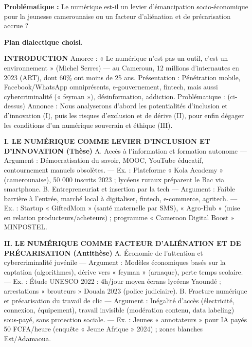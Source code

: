\documentclass[11pt]{article}
\begin{document}
\begin{exoresolu}
\textbf{Problématique :} Le numérique est-il un levier d'émancipation socio-économique pour la jeunesse camerounaise ou un facteur d'aliénation et de précarisation accrue ?

\textbf{Plan dialectique choisi.}

\textbf{INTRODUCTION}
Amorce : « Le numérique n'est pas un outil, c'est un environnement » (Michel Serres) — au Cameroun, 12 millions d'internautes en 2023 (ART), dont 60\% ont moins de 25 ans.
Présentation : Pénétration mobile, Facebook/WhatsApp omniprésents, e-gouvernement, fintech, mais aussi cybercriminalité (« feyman »), désinformation, addiction.
Problématique : (ci-dessus)
Annonce : Nous analyserons d'abord les potentialités d'inclusion et d'innovation (I), puis les risques d'exclusion et de dérive (II), pour enfin dégager les conditions d'un numérique souverain et éthique (III).

\textbf{I. LE NUMÉRIQUE COMME LEVIER D'INCLUSION ET D'INNOVATION (Thèse)}
A. Accès à l'information et formation autonome
— Argument : Démocratisation du savoir, MOOC, YouTube éducatif, contournement manuels obsolètes.
— Ex. : Plateforme « Kola Academy » (camerounaise), 50 000 inscrits 2023 ; lycéens ruraux préparent le Bac via smartphone.
B. Entrepreneuriat et insertion par la tech
— Argument : Faible barrière à l'entrée, marché local à digitaliser, fintech, e-commerce, agritech.
— Ex. : Startup « GiftedMom » (santé maternelle par SMS), « Agro-Hub » (mise en relation producteurs/acheteurs) ; programme « Cameroon Digital Boost » MINPOSTEL.

\textbf{II. LE NUMÉRIQUE COMME FACTEUR D'ALIÉNATION ET DE PRÉCARISATION (Antithèse)}
A. Économie de l'attention et cybercriminalité juvénile
— Argument : Modèles économiques basés sur la captation (algorithmes), dérive vers « feyman » (arnaque), perte temps scolaire.
— Ex. : Étude UNESCO 2022 : 4h/jour moyen écrans lycéens Yaoundé ; arrestations « brouteurs » Douala 2023 (police judiciaire).
B. Fracture numérique et précarisation du travail de clic
— Argument : Inégalité d'accès (électricité, connexion, équipement), travail invisible (modération contenu, data labeling) sous-payé, sans protection sociale.
— Ex. : Jeunes « annotateurs » pour IA payés 50 FCFA/heure (enquête « Jeune Afrique » 2024) ; zones blanches Est/Adamaoua.


\end{exoresolu}
\end{document}
